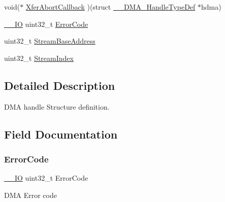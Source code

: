 \begin{DoxyCompactItemize}
\item 
void($\ast$ \mbox{\hyperlink{struct_____d_m_a___handle_type_def_a70376f061d856fdda49c8c23c9bb5b22}{Xfer\+Abort\+Callback}} )(struct \mbox{\hyperlink{struct_____d_m_a___handle_type_def}{\+\_\+\+\_\+\+D\+M\+A\+\_\+\+Handle\+Type\+Def}} $\ast$hdma)
\item 
\mbox{\hyperlink{core__sc300_8h_aec43007d9998a0a0e01faede4133d6be}{\+\_\+\+\_\+\+IO}} uint32\+\_\+t \mbox{\hyperlink{struct_____d_m_a___handle_type_def_a123c5063e6a3b1901b2fbe5f88c53a7e}{Error\+Code}}
\item 
uint32\+\_\+t \mbox{\hyperlink{struct_____d_m_a___handle_type_def_a053ff68722cdf5ac37aa305e04e2b1c8}{Stream\+Base\+Address}}
\item 
uint32\+\_\+t \mbox{\hyperlink{struct_____d_m_a___handle_type_def_aa3ca4a9a3d300e05d7ff46613f43fd54}{Stream\+Index}}
\end{DoxyCompactItemize}


\subsection{Detailed Description}
D\+MA handle Structure definition. 

\subsection{Field Documentation}
\mbox{\label{struct_____d_m_a___handle_type_def_a123c5063e6a3b1901b2fbe5f88c53a7e}} 
\subsubsection{\texorpdfstring{Error\+Code}{ErrorCode}}
{\footnotesize\ttfamily \mbox{\hyperlink{core__sc300_8h_aec43007d9998a0a0e01faede4133d6be}{\+\_\+\+\_\+\+IO}} uint32\+\_\+t Error\+Code}

D\+MA Error code \mbox{\label{struct_____d_m_a___handle_type_def_a4352c7144ad5e1e4ab54a87d3be6eb62}} 
